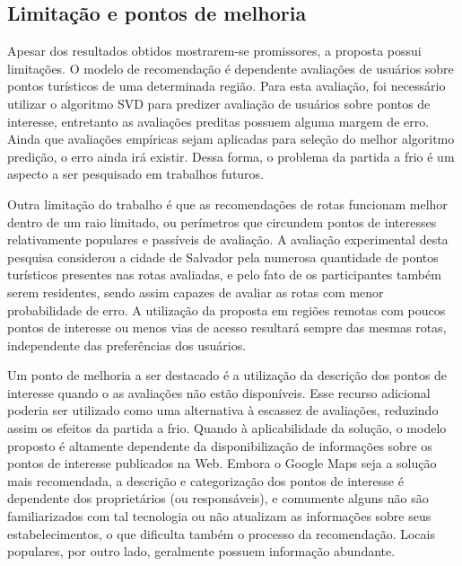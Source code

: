 \documentclass[portuguese]{textolivre}
\begin{document}
\subsection{Limitação e pontos de melhoria}
Apesar dos resultados obtidos mostrarem-se promissores, a proposta possui limitações. O modelo de recomendação é dependente avaliações de usuários sobre pontos turísticos de uma determinada região. Para esta avaliação, foi necessário utilizar o algoritmo SVD para predizer avaliação de usuários sobre pontos de interesse, entretanto as avaliações preditas possuem alguma margem de erro. Ainda que avaliações empíricas sejam aplicadas para seleção do melhor algoritmo predição, o erro ainda irá existir. Dessa forma, o problema da partida a frio é um aspecto a ser pesquisado em trabalhos futuros. 

Outra limitação do trabalho é que as recomendações de rotas funcionam melhor dentro de um raio limitado, ou perímetros que circundem pontos de interesses relativamente populares e passíveis de avaliação. A avaliação experimental desta pesquisa considerou a cidade de Salvador pela numerosa quantidade de pontos turísticos presentes nas rotas avaliadas, e pelo fato de os participantes também serem residentes, sendo assim capazes de avaliar as rotas com menor probabilidade de erro. A utilização da proposta em regiões remotas com poucos pontos de interesse ou menos vias de acesso resultará sempre das mesmas rotas, independente das preferências dos usuários. 

Um ponto de melhoria a ser destacado é a utilização da descrição dos pontos de interesse quando o as avaliações não estão disponíveis. Esse recurso adicional poderia ser utilizado como uma alternativa à escassez de avaliações, reduzindo assim os efeitos da partida a frio. Quando à aplicabilidade da solução, o modelo proposto é altamente dependente da disponibilização de informações sobre os pontos de interesse publicados na Web. Embora o Google Maps seja a solução mais recomendada, a descrição e categorização dos pontos de interesse é dependente dos proprietários (ou responsáveis), e comumente alguns não são familiarizados com tal tecnologia ou não atualizam as informações sobre seus estabelecimentos, o que dificulta também o processo da recomendação. Locais populares, por outro lado, geralmente possuem informação abundante.
\end{document}

